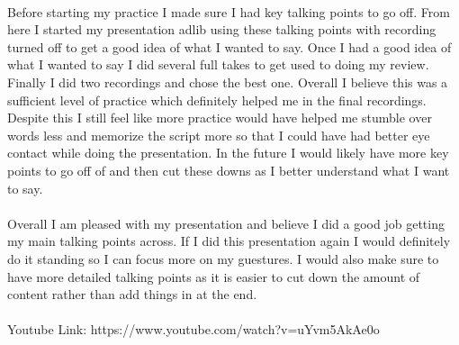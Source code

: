 \documentclass[11pt, a4paper]{article}
\begin{document}
	\paragraph{} {Before starting my practice I made sure I had key talking points to go off. From here I started my presentation adlib using these talking points with recording turned off to get a good idea of what I wanted to say. Once I had a good idea of what I wanted to say I did several full takes to get used to doing my review. Finally I did two recordings and chose the best one. Overall I believe this was a sufficient level of practice which definitely helped me in the final recordings. Despite this I still feel like more practice would have helped me stumble over words less and memorize the script more so that I could have had better eye contact while doing the presentation. In the future I would likely have more key points to go off of and then cut these downs as I better understand what I want to say. }
	\paragraph{} {Overall I am pleased with my presentation and believe I did a good job getting my main talking points across. If I did this presentation again I would definitely do it standing so I can focus more on my guestures. I would also make sure to have more detailed talking points as it is easier to cut down the amount of content rather than add things in at the end. }
	\\
	\\
	Youtube Link: https://www.youtube.com/watch?v=uYvm5AkAe0o
	
	
	
	
\end{document}
